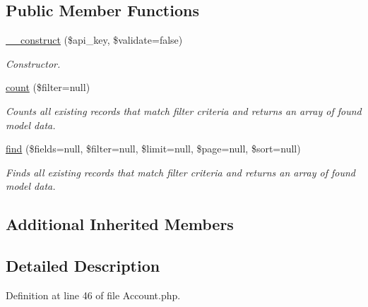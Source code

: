 \subsection*{Public Member Functions}
\begin{DoxyCompactItemize}
\item 
\hyperlink{classTune_1_1Management_1_1Api_1_1Account_a5b8e619064ca9ae86956159732167d6e}{\-\_\-\-\_\-construct} (\$api\-\_\-key, \$validate=false)
\begin{DoxyCompactList}\small\item\em Constructor. \end{DoxyCompactList}\item 
\hyperlink{classTune_1_1Management_1_1Api_1_1Account_aa5c03dc594104c4d20116147a8679b34}{count} (\$filter=null)
\begin{DoxyCompactList}\small\item\em Counts all existing records that match filter criteria and returns an array of found model data. \end{DoxyCompactList}\item 
\hyperlink{classTune_1_1Management_1_1Api_1_1Account_a84ed9a047288703eddfbde9d94348ccb}{find} (\$fields=null, \$filter=null, \$limit=null, \$page=null, \$sort=null)
\begin{DoxyCompactList}\small\item\em Finds all existing records that match filter criteria and returns an array of found model data. \end{DoxyCompactList}\end{DoxyCompactItemize}
\subsection*{Additional Inherited Members}


\subsection{Detailed Description}


Definition at line 46 of file Account.\-php.



